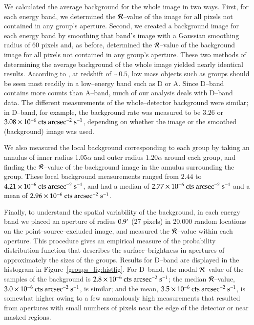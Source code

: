 We calculated the average background for the whole image in two ways.
First, for each energy band, we determined the $\mathcal{R}$--value of the
image for all pixels not contained in any group's aperture.  Second,
we created a background image for each energy band by smoothing that
band's image with a Gaussian smoothing radius of 60 pixels and, as
before, determined the $\mathcal{R}$--value of the background image for all
pixels not contained in any group's aperture.  These two methods of
determining the average background of the whole image yielded nearly
identical results.  According to \citet{scharf2002}, at redshift of
$\sim 0.5$, low mass objects such as groups should be seen most
readily in a low--energy band such as D or A.  Since D--band contains
more counts than A--band, much of our analysis deals with D--band
data.  The different measurements of the whole--detector background
were similar; in D--band, for example, the background rate was
measured to be $3.26$ or
$3.08\times 10^{-6}{\rm~cts~arcsec^{-2}~s^{-1}}$, depending on whether
the image or the smoothed (background) image was used.

We also measured the local background corresponding to each group by
taking an annulus of inner radius $1.05\alpha$ and outer radius
$1.20\alpha$ around each group, and finding the $\mathcal{R}$--value of the
background image in the annulus surrounding the group.  These local
background measurements ranged from $2.44$ to
$4.21\times 10^{-6}{\rm~cts~arcsec^{-2}~s^{-1}}$, and had a median of
$2.77\times 10^{-6}{\rm~cts~arcsec^{-2}~s^{-1}}$ and a mean of
$2.96\times 10^{-6}{\rm~cts~arcsec^{-2}~s^{-1}}$.

Finally, to understand the spatial variability of the background, in
each energy band we placed an aperture of radius $0.9\mbox{$^\prime$}$ (27
pixels) in 20,000 random locations on the point--source--excluded
image, and measured the $\mathcal{R}$--value within each aperture.  This
procedure gives an empirical measure of the probability distribution
function that describes the surface--brightness in apertures of
approximately the sizes of the groups.  Results for D--band are
displayed in the histogram in Figure~\ref{groups_fig:histfig}.  For
D--band, the modal $\mathcal{R}$--value of the samples of the background is
$2.8\times10^{-6}{\rm~cts~arcsec^{-2}~s^{-1}}$; the median
$\mathcal{R}$--value, $3.0\times10^{-6}{\rm~cts~arcsec^{-2}~s^{-1}}$, is
similar; and the mean, $3.5\times10^{-6}{\rm~cts~arcsec^{-2}~s^{-1}}$,
is somewhat higher owing to a few anomalously high measurements that
resulted from apertures with small numbers of pixels near the edge of
the detector or near masked regions.

